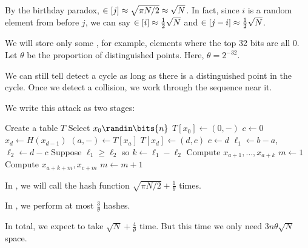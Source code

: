 \documentclass[class=co487,tikz,minted,notes]{agony}
\begin{document}
By the birthday paradox, $\in[j] \approx \sqrt{\pi N/2} \approx \sqrt{N}$.
In fact, since $i$ is a random element from before $j$,
we can say $\in[i] \approx \frac12\sqrt{N}$ and $\in[j-i] \approx \frac12\sqrt{N}$.

We will store only some ,
for example, elements where the top 32 bits are all 0.
Let $\theta$ be the proportion of distinguished points.
Here, $\theta = 2^{-32}$.

We can still tell detect a cycle as long as there is a distinguished point in the cycle.
Once we detect a collision, we work through the sequence near it.

\begin{attack}
  We write this attack as two stages:
  \begin{algorithmic}[1]
    \State Create a table $T$
      \State Select $x_0 \randin \bits{n}$
      \State $T[x_0] \gets (0,-)$ 
      \State $c \gets 0$ 
        \State $x_d \gets H(x_{d-1})$
            \State $(a,-) \gets T[x_a]$ 
            \State {}
          \EndIf
          \State $T[x_d] \gets (d,c)$
          \State $c \gets d$
        \EndIf
      \EndFor
    \EndProcedure
      \State $\ell_1 \gets b-a$, $\ell_2 \gets d-c$
      \State Suppose $\ell_1 \geq \ell_2$ so $k \gets \ell_1 - \ell_2$
      \State Compute $x_{a+1},\dotsc,x_{a+k}$
      \State $m \gets 1$
      \Repeat
        \State Compute $x_{a+k+m}, x_{c+m}$
        \State $m \gets m + 1$
      \State {} 
    \EndProcedure
  \end{algorithmic}
\end{attack}

In , we will call the hash function
$\sqrt{\pi N/2} + \frac{1}{\theta}$ times.

In , we perform at most $\frac{3}{\theta}$ hashes.

In total, we expect to take $\sqrt{N}+\frac{4}{\theta}$ time.
But this time we only need $3n\theta\sqrt{N}$ space.
\end{document}
